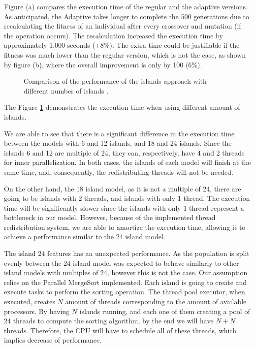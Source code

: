 \documentclass[runningheads]{llncs}
\begin{document}
Figure (a) compares the execution time of the regular and the adaptive versions. As anticipated, the Adaptive takes longer to complete the 500 generations due to recalculating the fitness of an individual after every crossover and mutation (if the operation occurs). The recalculation increased the execution time by approximately 1.000 seconds (+8\%). The extra time could be justifiable if the fitness was much lower than the regular version, which is not the case, as shown by figure (b), where the overall improvement is only by 100 (6\%).

\begin{figure}[H]
\centering
{}
\caption{Comparison of the performance of the islands approach with different number of islands .} \label{comparacaoilhas}
\end{figure}

The Figure \ref{comparacaoilhas} demonstrates the execution time when using different amount of islands.

We are able to see that there is a significant difference in the execution time between the models with 6 and 12 islands, and 18 and 24 islands. Since the islands 6 and 12 are multiple of 24, they can, respectively, have 4 and 2 threads for inner parallelization. In both cases, the islands of each model will finish at the same time, and, consequently, the redistributing threads will not be needed.

On the other hand, the 18 island model, as it is not a multiple of 24, there are going to be islands with 2 threads, and islands with only 1 thread. The execution time will be significantly slower since the islands with only 1 thread represent a bottleneck in our model. However, because of the implemented thread redistribution system, we are able to amortize the execution time, allowing it to achieve a performance similar to the 24 island model.

The island 24 features has an unexpected performance. As the population is split evenly between the 24 island model was expected to behave similarly to other island models with multiples of 24, however this is not the case. Our assumption relies on the Parallel MergeSort implemented. Each island is going to create and execute tasks to perform the sorting operation. The thread pool executor, when executed, creates $N$ amount of threads corresponding to the amount of available processors. By having $N$ islands running, and each one of them creating a pool of 24 threads to compute the sorting algorithm, by the end we will have $N+N$ threads. Therefore, the CPU will have to schedule all of these threads, which implies decrease of performance.
\end{document}
